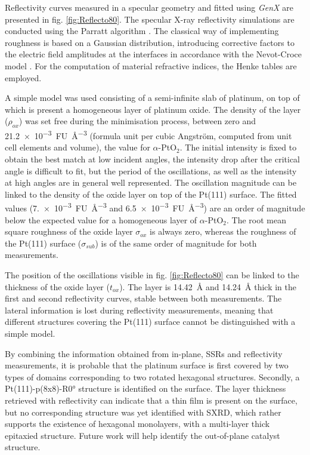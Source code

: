 Reflectivity curves measured in a specular geometry and fitted using \textit{GenX} \parencite{Bjorck2007, Glavic2022} are presented in fig. \ref{fig:Reflecto80}.
The specular X-ray reflectivity simulations are conducted using the Parratt algorithm \parencite{Parratt1954}.
The classical way of implementing roughness is based on a Gaussian distribution, introducing corrective factors to the electric field amplitudes at the interfaces in accordance with the Nevot-Croce model \parencite{Nevot1980}.
For the computation of material refractive indices, the Henke tables \parencite{Henke1993} are employed.

A simple model was used consisting of a semi-infinite slab of platinum, on top of which is present a homogeneous layer of platinum oxide.
The density of the layer ($\rho_{ox}$) was set free during the minimisation process, between zero and \qty{21.2e-3}{FU\per\cubic\angstrom} (formula unit per cubic Angström, computed from unit cell elements and volume), the value for $\alpha$-PtO$_2$.
The initial intensity is fixed to obtain the best match at low incident angles, the intensity drop after the critical angle is difficult to fit, but the period of the oscillations, as well as the intensity at high angles are in general well represented.
The oscillation magnitude can be linked to the density of the oxide layer on top of the Pt(111) surface.
The fitted values (\qty{7.e-3}{FU\per\cubic\angstrom} and \qty{6.5e-3}{FU\per\cubic\angstrom}) are an order of magnitude below the expected value for a homogeneous layer of $\alpha$-PtO$_2$.
The root mean square roughness of the oxide layer $\sigma_{ox}$ is always zero, whereas the roughness of the Pt(111) surface ($\sigma_{sub}$) is of the same order of magnitude for both measurements.

The position of the oscillations visible in fig. \ref{fig:Reflecto80} can be linked to the thickness of the oxide layer ($t_{ox}$).
The layer is \qty{14.42}{\angstrom} and \qty{14.24}{\angstrom} thick in the first and second reflectivity curves, stable between both measurements.
The lateral information is lost during reflectivity measurements, meaning that different structures covering the Pt(111) surface cannot be distinguished with a simple model.

By combining the information obtained from in-plane, SSRs and reflectivity measurements, it is probable that the platinum surface is first covered by two types of domains corresponding to two rotated hexagonal structures.
Secondly, a Pt(111)-p(8x8)-R\ang{0} structure is identified on the surface.
The layer thickness retrieved with reflectivity can indicate that a thin film is present on the surface, but no corresponding structure was yet identified with SXRD, which rather supports the existence of hexagonal monolayers, with a multi-layer thick epitaxied structure.
Future work will help identify the out-of-plane catalyst structure.

